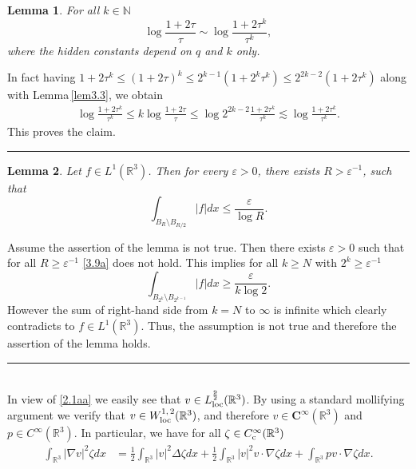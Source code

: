 \documentclass[12pt]{article}
\numberwithin{equation}{section}
\newtheorem{lem}{Lemma}[section]
\theoremstyle{definition}
\begin{document}
\begin{lem}
\label{lem3.4} For all $ k\in {\mathbb{N}}$
\begin{equation}
\log \frac{1+2 \tau }{\tau } \sim \log \frac{1+ 2\tau ^k}{\tau ^k}, 
\label{3.7}
\end{equation}
where the hidden constants depend on $ q$ and $ k$ only. 

\end{lem}
 In fact having  
$ 1+ 2\tau^k \le (1+2\tau )^k \le 2^{ k-1} (1+ 2^k\tau ^k) \le 2^{ 2k-2}(1+ 2\tau ^k)$ along with Lemma\,\ref{lem3.3}, we obtain 
\begin{align*}
\log \frac{1+ 2\tau^k }{\tau^k } \le k \log \frac{1+ 2\tau}{\tau} \le  \log 2^{ 2k -2}\frac{1+ 2\tau ^k}{\tau^k }
\lesssim  \log \frac{1+ 2\tau^k }{\tau^k }. 
\end{align*}
This proves the claim.  \hfill {\rule{0.2cm}{0.2cm}} 

\begin{lem}
\label{lem2.3}
Let $ f \in L^1({\mathbb{R}}^{3})$. Then for every $ {\varepsilon} >0$, there exists $ R > {\varepsilon} ^{ -1}$, such that 
\begin{equation}
{\int\limits}_{B_{ R}  \setminus B_{ R/2}} | f| dx \le  \frac{\varepsilon}{\log R}.  
\label{3.9a}
\end{equation}

\end{lem}

  Assume the assertion of the lemma is not true. Then there exists $ {\varepsilon} >0$  such that  for all $ R \ge {\varepsilon} ^{ -1}$
\eqref{3.9a} does not hold. This implies for all  
 $ k \ge N$ with $ 2^k \ge {\varepsilon} ^{ -1}$
\[
{\int\limits}_{B_{ 2^k}  \setminus B_{ 2^{ k-1}}} | f| dx\ge  \frac{\varepsilon}{k\log 2}. 
\]
However the sum of  right-hand side from $ k=N$ to $ \infty$ is  infinite  which clearly contradicts to $ f\in L^1({\mathbb{R}}^{3})$. 
Thus, the assumption is not true and therefore the assertion of the lemma holds.  \hfill {\rule{0.2cm}{0.2cm}}      \\

 In view of \eqref{2.1aa} we easily see that $ {v} \in L ^{ \frac92}_{ \rm loc}({\mathbb{R}}^{3})$. By using a standard mollifying argument we  
verify that ${v} \in W^{1,\, 2}_{ \rm loc}({\mathbb{R}}^{3})$, and therefore $ {v} \in {\boldsymbol C}^ \infty({\mathbb{R}}^{3})$ and $ p\in C^{\infty}({\mathbb{R}}^{3})$. 
In particular, we have for all $ \zeta \in C^{\infty}_{ \rm c}({\mathbb{R}}^{3})$ 
\begin{align}
{\int\limits}_{ {\mathbb{R}}^{3}} | \nabla {v} |^2 \zeta dx &= \frac{1}{2}  {\int\limits}_{ {\mathbb{R}}^{3}} |{v} |^2 \Delta  \zeta dx
 + \frac{1}{2}{\int\limits}_{ {\mathbb{R}}^{3}} | {v} |^2 {v} \cdot \nabla \zeta dx+ {\int\limits}_{ {\mathbb{R}}^{3}} p {v} \cdot \nabla \zeta dx. 
\label{4.1}
\end{align}
\end{document}
